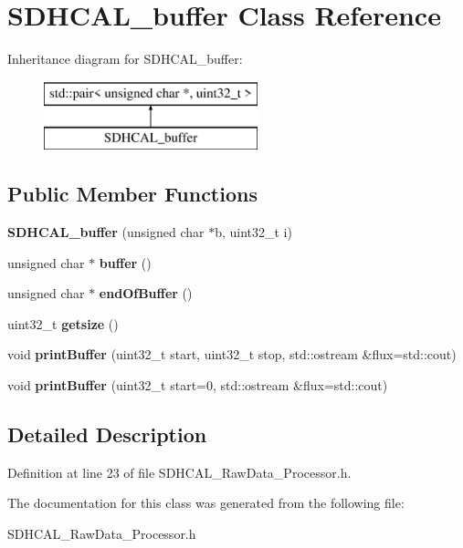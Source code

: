 \section{S\-D\-H\-C\-A\-L\-\_\-buffer Class Reference}
\label{classSDHCAL__buffer}
Inheritance diagram for S\-D\-H\-C\-A\-L\-\_\-buffer\-:\begin{figure}[H]
\begin{center}
\leavevmode
\includegraphics[height=2.000000cm]{classSDHCAL__buffer}
\end{center}
\end{figure}
\subsection*{Public Member Functions}
\begin{DoxyCompactItemize}
\item 
{\bfseries S\-D\-H\-C\-A\-L\-\_\-buffer} (unsigned char $\ast$b, uint32\-\_\-t i)\label{classSDHCAL__buffer_a66035b5c40a02dd9ff13b7f8b6f02220}

\item 
unsigned char $\ast$ {\bfseries buffer} ()\label{classSDHCAL__buffer_a62944e38a31adc9c946f7850853eccce}

\item 
unsigned char $\ast$ {\bfseries end\-Of\-Buffer} ()\label{classSDHCAL__buffer_adc6469aa1a4370f5a79c4d0440a5fa3f}

\item 
uint32\-\_\-t {\bfseries getsize} ()\label{classSDHCAL__buffer_a164f52f488dd2e7a75ab162ec7910c6e}

\item 
void {\bfseries print\-Buffer} (uint32\-\_\-t start, uint32\-\_\-t stop, std\-::ostream \&flux=std\-::cout)\label{classSDHCAL__buffer_ab8eb79883e3aa5f2428721b074fac450}

\item 
void {\bfseries print\-Buffer} (uint32\-\_\-t start=0, std\-::ostream \&flux=std\-::cout)\label{classSDHCAL__buffer_a3521819be02bb8c672271ad657c54082}

\end{DoxyCompactItemize}


\subsection{Detailed Description}


Definition at line 23 of file S\-D\-H\-C\-A\-L\-\_\-\-Raw\-Data\-\_\-\-Processor.\-h.



The documentation for this class was generated from the following file\-:\begin{DoxyCompactItemize}
\item 
S\-D\-H\-C\-A\-L\-\_\-\-Raw\-Data\-\_\-\-Processor.\-h\end{DoxyCompactItemize}
